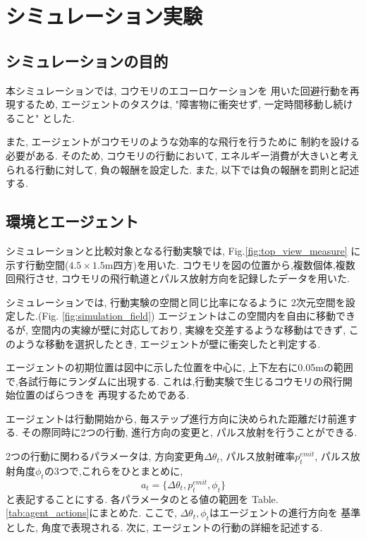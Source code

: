 \documentclass[../main]{subfiles}
\begin{document}
\newpage
\chapter{シミュレーション実験}
\label{chap:simulation}

\section{シミュレーションの目的}
本シミュレーションでは, コウモリのエコーロケーションを
用いた回避行動を再現するため, エージェントのタスクは, 
"障害物に衝突せず, 一定時間移動し続けること" とした.

また, エージェントがコウモリのような効率的な飛行を行うために
制約を設ける必要がある.
そのため, コウモリの行動において, 
エネルギー消費が大きいと考えられる行動に対して, 
負の報酬を設定した.
また, 以下では負の報酬を罰則と記述する.

\section{環境とエージェント}
シミュレーションと比較対象となる行動実験では,
Fig.\ref{fig:top_view_measure}
に示す行動空間($4.5 \times 1.5$\si{m}四方)を用いた.
コウモリを図の位置から,複数個体,複数回飛行させ,
コウモリの飛行軌道とパルス放射方向を記録したデータを用いた.

シミュレーションでは, 行動実験の空間と同じ比率になるように
2次元空間を設定した.(Fig. \ref{fig:simulation_field})
エージェントはこの空間内を自由に移動できるが,
空間内の実線が壁に対応しており,
実線を交差するような移動はできず, 
このような移動を選択したとき, 
エージェントが壁に衝突したと判定する.

エージェントの初期位置は図中に示した位置を中心に,
上下左右に0.05\si{m}の範囲で,各試行毎にランダムに出現する.
これは,行動実験で生じるコウモリの飛行開始位置のばらつきを
再現するためである.

エージェントは行動開始から, 
毎ステップ進行方向に決められた距離だけ前進する.
その際同時に2つの行動, 
進行方向の変更と,
パルス放射を行うことができる.

2つの行動に関わるパラメータは,
方向変更角$\Delta\theta_t$,
パルス放射確率$p^{emit}_t$,
パルス放射角度$\phi_t$の3つで,これらをひとまとめに,
$$a_t=\{\Delta\theta_t, p^{emit}_t, \phi_t \}$$
と表記することにする.
各パラメータのとる値の範囲を
Table.\ref{tab:agent_actions}にまとめた.
ここで, $\Delta\theta_t, \phi_t$はエージェントの進行方向を
基準とした, 角度で表現される.
次に, エージェントの行動の詳細を記述する.
\end{document}
